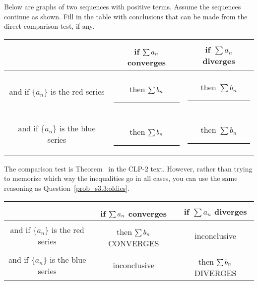 \begin{question}\label{prob_s3.3:compareintuitive}
Below are graphs of two sequences with positive terms.  Assume the sequences continue as shown. Fill in the table with conclusions that can be made from the direct comparison test, if any.
\begin{center}\end{center}
\begin{center}\begin{tabular}{|c|c|c|}
\hline
& if $\sum\limits^{\vphantom{\frac12}} a_n$ converges & if $\sum a_n$ diverges\\[10pt]
\hline
\color{red} and if $\{a_n\}$ is the red series& \color{blue}then $\sum\limits^{\vphantom{\frac12}} b_n$ \rule{1.5cm}{1pt}& \color{blue}then $\sum b_n$ \rule{1.5cm}{1pt}\\[10pt]
\hline
\color{blue} and if $\{a_n\}$ is the blue series& \color{red}then $\sum\limits^{\vphantom{\frac12}} b_n$ \rule{1.5cm}{1pt}& \color{red}then $\sum b_n$ \rule{1.5cm}{1pt}\\[10pt]
\hline
\end{tabular}\end{center}
\end{question}
\begin{hint}
The comparison test is Theorem~ in the CLP-2 text. However, rather than trying to memorize which way the inequalities go in all cases, you can use the same reasoning as Question~\ref{prob_s3.3:oldies}.
\end{hint}
\begin{answer}

\begin{tabular}{|c|c|c|}
\hline
& if $\sum\limits^{\vphantom{\frac12}} a_n$ converges & if $\sum a_n$ diverges\\[10pt]
\hline
\color{red} and if $\{a_n\}$ is the red series& \color{blue}then $\sum\limits^{\vphantom{\frac12}} b_n$ CONVERGES&inconclusive \\[10pt]
\hline
\color{blue} and if $\{a_n\}$ is the blue series&inconclusive& \color{red}then $\sum\limits^{\vphantom{\frac12}} b_n$ DIVERGES\\[10pt]
\hline
\end{tabular}
\end{answer}
